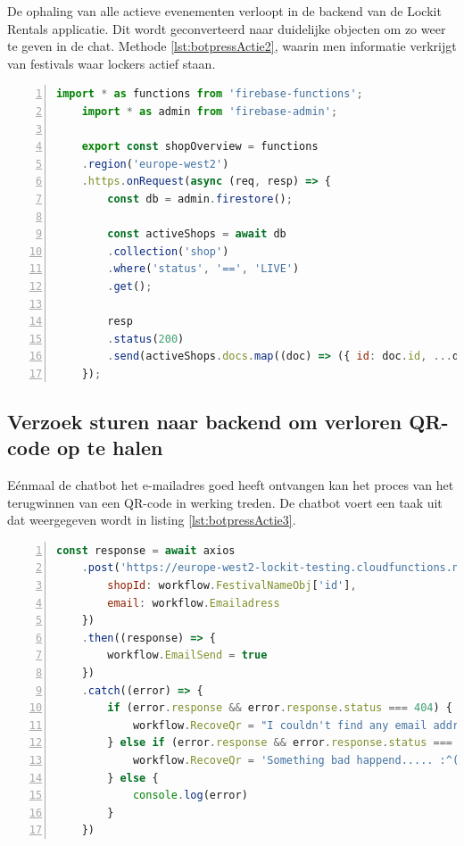 De ophaling van alle actieve evenementen verloopt in de backend van de Lockit Rentals applicatie. Dit wordt geconverteerd naar duidelijke objecten om zo weer te geven in de chat.
Methode \ref{lst:botpressActie2}, waarin men informatie verkrijgt van festivals waar lockers actief staan.
\begin{lstlisting}[language=JavaScript, caption={Methode waarin festivals worden ogpehaald waar lockers actie zijn \autocite{LockitRentals}.}, label=lst:botpressActie2, numbers=left]
    import * as functions from 'firebase-functions';
    import * as admin from 'firebase-admin';
    
    export const shopOverview = functions
    .region('europe-west2')
    .https.onRequest(async (req, resp) => {
        const db = admin.firestore();
        
        const activeShops = await db
        .collection('shop')
        .where('status', '==', 'LIVE')
        .get();
        
        resp
        .status(200)
        .send(activeShops.docs.map((doc) => ({ id: doc.id, ...doc.data() })));
    });
\end{lstlisting}

\subsection{Verzoek sturen naar backend om verloren QR-code op te halen}
\label{versturenRequestEmail}

Eénmaal de chatbot het e-mailadres goed heeft ontvangen kan het proces van het terugwinnen van een QR-code in werking treden. De chatbot voert een taak uit dat weergegeven wordt in listing \ref{lst:botpressActie3}. 

\begin{lstlisting}[language=JavaScript, caption={Een blok uitvoerbare code geschreven in javascript in een actie van Botpress. Deze code zal een verzoek uitsturen en het antwoord hiervan capteren \autocite{LockitRentals}.}, label=lst:botpressActie3, numbers=left]
    const response = await axios
    .post('https://europe-west2-lockit-testing.cloudfunctions.net/recoverLostCode', {
        shopId: workflow.FestivalNameObj['id'],
        email: workflow.Emailadress
    })
    .then((response) => {
        workflow.EmailSend = true
    })
    .catch((error) => {
        if (error.response && error.response.status === 404) {
            workflow.RecoveQr = "I couldn't find any email address associated with a purchased QR code. Please try again."
        } else if (error.response && error.response.status === 500) {
            workflow.RecoveQr = 'Something bad happend..... :^('
        } else {
            console.log(error)
        }
    })
\end{lstlisting}

